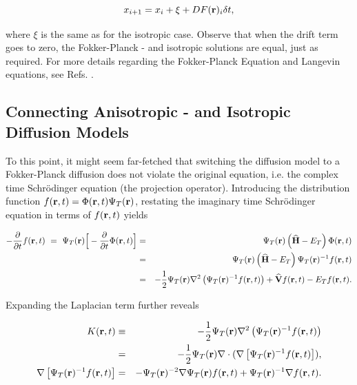 \begin{equation}
 \label{eq:langevinSolFP}
 x_{i+1} = x_i + \xi + DF(\mathbf{r})_i\delta t,
\end{equation}

where $\xi$ is the same as for the isotropic case. Observe that when the drift term goes to zero, the Fokker-Planck - and isotropic solutions are equal, just as required. For more details regarding the Fokker-Planck Equation and Langevin equations, see Refs. \cite{Gardiner:2004bk, risken1989fpe, langevin}.


\subsection{Connecting Anisotropic - and Isotropic Diffusion Models}
\label{sec:ConnectAnisIs}

To this point, it might seem far-fetched that switching the diffusion model to a Fokker-Planck diffusion does not violate the original equation, i.e. the complex time Schrödinger equation (the projection operator). Introducing the distribution function $f(\mathbf{r}, t) = \Phi(\mathbf{r}, t)\Psi_T(\mathbf{r})$, restating the imaginary time Schrödinger equation in terms of $f(\mathbf{r}, t)$ yields

\begin{eqnarray}
-\frac{\partial}{\partial t}f(\mathbf{r}, t)\,\, = \,\,\Psi_T(\mathbf{r})\Big[-\frac{\partial}{\partial t}\Phi(\mathbf{r}, t)\Big] &=& \Psi_T(\mathbf{r})\left({\bf\widehat{H}} - E_T\right)\Phi(\mathbf{r}, t) \nonumber\\
         &=& \Psi_T(\mathbf{r})\left({\bf\widehat{H}} - E_T\right)\Psi_T(\mathbf{r})^{-1}f(\mathbf{r}, t) \label{eq:impSamplRaw}\\
         &=& -\frac{1}{2}\Psi_T(\mathbf{r})\nabla^2 \left(\Psi_T(\mathbf{r})^{-1}f(\mathbf{r}, t)\right) + {\bf\widehat{V}}f(\mathbf{r}, t) - E_Tf(\mathbf{r},t).\nonumber
\end{eqnarray}

Expanding the Laplacian term further reveals

\begin{eqnarray}
K(\mathbf{r}, t) &\equiv& -\frac{1}{2}\Psi_T(\mathbf{r})\nabla^2 \left(\Psi_T(\mathbf{r})^{-1}f(\mathbf{r}, t)\right) \nonumber\\
 &=& -\frac{1}{2}\Psi_T(\mathbf{r})\nabla\cdot (\nabla\left[\Psi_T(\mathbf{r})^{-1}f(\mathbf{r}, t)\right]), \\
\nabla\left[\Psi_T(\mathbf{r})^{-1}f(\mathbf{r}, t)\right] &=& -\Psi_T(\mathbf{r})^{-2}\nabla \Psi_T(\mathbf{r}) f(\mathbf{r}, t) + \Psi_T(\mathbf{r})^{-1}\nabla f(\mathbf{r}, t).
\end{eqnarray}

